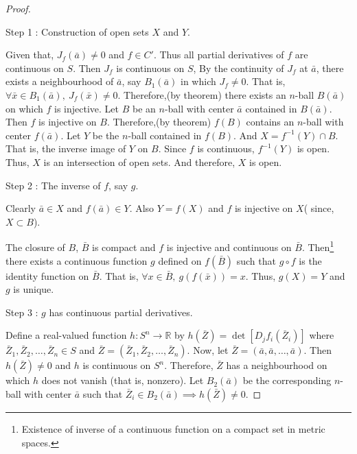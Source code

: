 \begin{proof}
\begin{commentary}Step 1 : Construction of open sets $X$ and $Y$.\end{commentary}

Given that, $J_f(\bar{a}) \ne 0$ and $f \in C'$.
Thus all partial derivatives of $f$ are continuous on $S$.
Then $J_f$ is continuous on $S$, 
By the continuity of $J_f$ at $\bar{a}$, there exists a neighbourhood of $\bar{a}$, say $B_1(\bar{a})$ in which $J_f \ne 0$.
That is, $\forall \bar{x} \in B_1(\bar{a}),\ J_f(\bar{x}) \ne 0$.
Therefore,(by theorem) there exists an $n$-ball $B(\bar{a})$ on which $f$ is injective.
Let $B$ be an $n$-ball with center $\bar{a}$ contained in $B(\bar{a})$.
Then $f$ is injective on $B$.
Therefore,(by theorem) $f(B)$ contains an $n$-ball with center $f(\bar{a})$.
Let $Y$ be the $n$-ball contained in $f(B)$.
And  $X=f^{-1}(Y) \cap B$.
That is, the inverse image of $Y$ on $B$.
Since $f$ is continuous, $f^{-1}(Y)$ is open.
Thus, $X$ is an intersection of open sets.
And therefore, $X$ is open.\\
\begin{commentary}Step 2 : The inverse of $f$, say $g$.\end{commentary}

Clearly $\bar{a} \in X$ and $f(\bar{a}) \in Y$.
Also $Y = f(X)$ and $f$ is injective on $X$( since, $X \subset B$).

The closure of $B$, $\bar{B}$ is compact and $f$ is injective and continuous on $\bar{B}$.
Then\footnote{Existence of inverse of a continuous function on a compact set in metric spaces.} there exists a continuous function $g$ defined on $f(\bar{B})$ such that $g \circ f$ is the identity function on $\bar{B}$.
That is, $\forall x \in \bar{B},\ g(f(\bar{x})) = x$.
Thus, $g(X) = Y$ and $g$ is unique.\\
\begin{commentary}Step 3 : $g$ has continuous partial derivatives.\end{commentary}

Define a real-valued function $h : S^n \to \mathbb{R}$ by $h(\bar{Z}) = \det[D_jf_i(\bar{Z}_i)]$ where $\bar{Z}_1,\bar{Z}_2,\dots,\bar{Z}_n \in S$ and $\bar{Z} = (\bar{Z}_1,\bar{Z}_2,\dots,\bar{Z}_n)$.
Now, let $\bar{Z} = (\bar{a},\bar{a},\dots,\bar{a})$.
Then $h(\bar{Z}) \ne 0$ and $h$ is continuous on $S^n$.
Therefore, $\bar{Z}$ has a neighbourhood on which $h$ does not vanish (that is, nonzero).
Let $B_2(\bar{a})$ be the corresponding $n$-ball with center $\bar{a}$ such that $\bar{Z}_i \in B_2(\bar{a}) \implies h(\bar{Z}) \ne 0$.


\end{proof}
